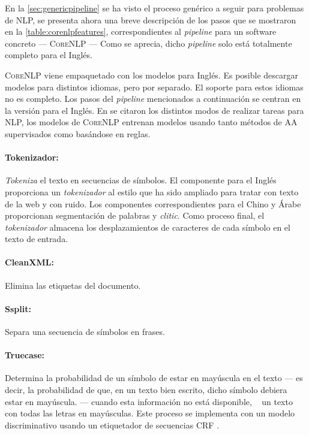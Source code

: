 En la \autoref{sec:genericpipeline} se ha visto el proceso genérico a seguir
para problemas de \ac{NLP}, se presenta ahora una breve descripción de
los pasos que se mostraron en la \autoref{table:corenlpfeatures},
correspondientes al \emph{pipeline} para un software concreto ---
\textsc{CoreNLP} \cite{Manning2014} --- Como se aprecia, dicho \emph{pipeline}
solo está totalmente completo para el Inglés.

\textsc{CoreNLP} viene empaquetado con los modelos para Inglés. Es posible
descargar modelos para distintos idiomas, pero por separado. El soporte para
estos idiomas no es completo. Los pasos del \emph{pipeline} mencionados a
continuación se centran en la versión para el Inglés. En
 se citaron los distintos modos de realizar tareas para
\ac{NLP}, los modelos de \textsc{CoreNLP} entrenan modelos usando tanto métodos
de \ac{AA} supervisados como basándose en reglas.

\paragraph{Tokenizador:} \emph{Tokeniza} el texto en secuencias de símbolos. El
componente para el Inglés proporciona un \emph{tokenizador} al estilo
 que ha sido ampliado para tratar con texto de la web y
con ruido. Los componentes correspondientes para el Chino y Árabe proporcionan
segmentación de palabras y \emph{clitic}. Como proceso final, el
\emph{tokenizador} almacena los desplazamientos de caracteres de cada símbolo en
el texto de entrada.

\paragraph{CleanXML:} Elimina las etiquetas  del documento.

\paragraph{Ssplit:} Separa una secuencia de símbolos en frases.

\paragraph{Truecase:} Determina la probabilidad de un símbolo de estar en
mayúscula en el texto --- es decir, la probabilidad de que, en un texto bien
escrito, dicho símbolo debiera estar en mayúscula. --- cuando esta información
no está disponible, \eg~ un texto con todas las letras en mayúsculas. Este
proceso se implementa con un modelo discriminativo usando un etiquetador de
secuencias \ac{CRF} \cite{Finkel2005}.

